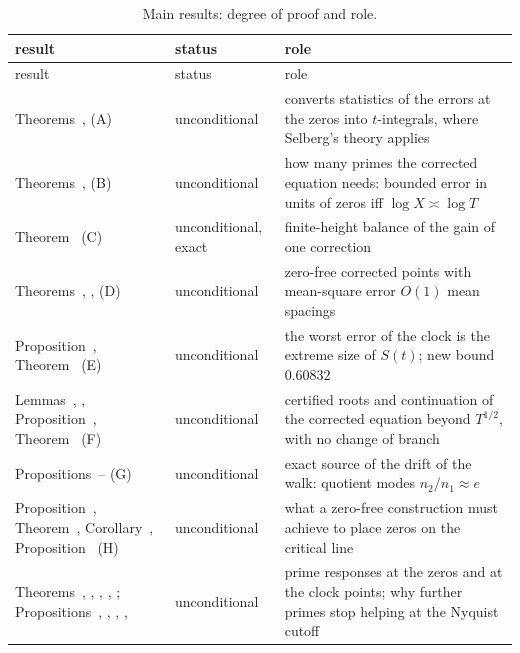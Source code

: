 \documentclass[preprint,12pt]{elsarticle}
\makeatletter
\let\CG@origref\ref
\newcommand{\CG@gettip}[1]{\@ifundefined{CGTip@#1}{Reference: #1}{\csname CGTip@#1\endcsname}}
\DeclareRobustCommand{\CGref}[1]{\pdftooltip{\CG@origref{#1}}{\CG@gettip{#1}}}
\numberwithin{equation}{section}
\theoremstyle{plain}
\theoremstyle{definition}
\theoremstyle{remark}
\makeatother
\begin{document}
\begin{center}
\footnotesize
\begin{longtable}{p{}p{}p{}}
\caption{Main results: degree of proof and role.}\label{tab:status}\\
\toprule
result & status & role\\
\midrule
\endfirsthead
\toprule
result & status & role\\
\midrule
\endhead
\bottomrule
\endfoot
Theorems~\CGref{thm:identity_general}, \CGref{thm:identity_g} (A) & unconditional & converts statistics of the errors at the zeros into $t$-integrals, where Selberg's theory applies\\
Theorems~\CGref{thm:main}, \CGref{thm:variable_cutoff} (B) & unconditional & how many primes the corrected equation needs: bounded error in units of zeros iff $\log X\asymp\log T$\\
Theorem~\CGref{thm:accounting} (C) & unconditional, exact & finite-height balance of the gain of one correction\\
Theorems~\CGref{thm:computable_clock}, \CGref{thm:second_step}, \CGref{thm:uniform_iteration} (D) & unconditional & zero-free corrected points with mean-square error $O(1)$ mean spacings\\
Proposition~\CGref{prop:envelope_equivalence}, Theorem~\CGref{thm:envelope} (E) & unconditional & the worst error of the clock is the extreme size of $S(t)$; new bound $0.60832$\\
Lemmas~\CGref{lem:monotone_sharp}, \CGref{lem:certified_root}, Proposition~\CGref{prop:residual_identity}, Theorem~\CGref{thm:continuation} (F) & unconditional & certified roots and continuation of the corrected equation beyond $T^{1/2}$, with no change of branch\\
Propositions~\CGref{prop:angular_radial}--\CGref{prop:quotient_modes} (G) & unconditional & exact source of the drift of the walk: quotient modes $n_2/n_1\approx e$\\
Proposition~\CGref{prop:isolated}, Theorem~\CGref{thm:local_separation}, Corollary~\CGref{cor:proportion}, Proposition~\CGref{prop:verification} (H) & unconditional & what a zero-free construction must achieve to place zeros on the critical line\\
Theorems~\CGref{thm:landau_line}, \CGref{thm:projection}, \CGref{thm:twist}, \CGref{thm:Fourier_exact}, \CGref{thm:computable_response}; Propositions~\CGref{prop:cross_term}, \CGref{prop:resonance}, \CGref{prop:pair_resonance}, \CGref{prop:almost_orthogonal}, \CGref{prop:spectral_energy} & unconditional & prime responses at the zeros and at the clock points; why further primes stop helping at the Nyquist cutoff\\

\end{longtable}
\end{center}
\end{document}
